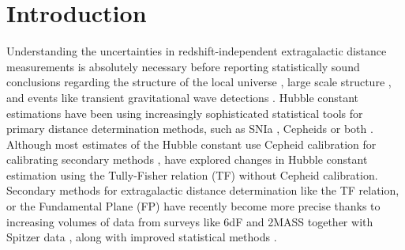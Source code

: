 \documentclass[a4paper,fleqn,usenatbib]{mnras}
\begin{document}
\section{Introduction}


Understanding the uncertainties in redshift-independent extragalactic distance measurements is absolutely necessary before reporting statistically sound conclusions regarding the structure of the local universe \citep{void,locunivcf,nongauss,6df,localunipv,said,gg3500}, large scale structure \citep{anishub,gallargescale,morphanis,tecciencia,bayesh}, and events like transient gravitational wave detections \citep{gwgallist}. Hubble constant estimations have been using increasingly sophisticated statistical tools for primary distance determination methods, such as SNIa \citep{ridsn,unity,hubsn2018}, Cepheids \citet{hubngc} or both \citep{riess}. Although most estimates of the Hubble constant use Cepheid calibration for calibrating secondary methods \citep{hubunc,huborig,hub2010}, \citet{noceph} have explored changes in Hubble constant estimation using the Tully-Fisher relation (TF) without Cepheid calibration. Secondary methods for extragalactic distance determination like the TF relation, or the Fundamental Plane (FP) have recently become more precise thanks to increasing volumes of data from surveys like 6dF \citep{6df}  and  2MASS \citep{2mass,tf07dist} together with Spitzer data \citep{sorce}, along with improved statistical methods \citep{precisetf}. \\
\end{document}
